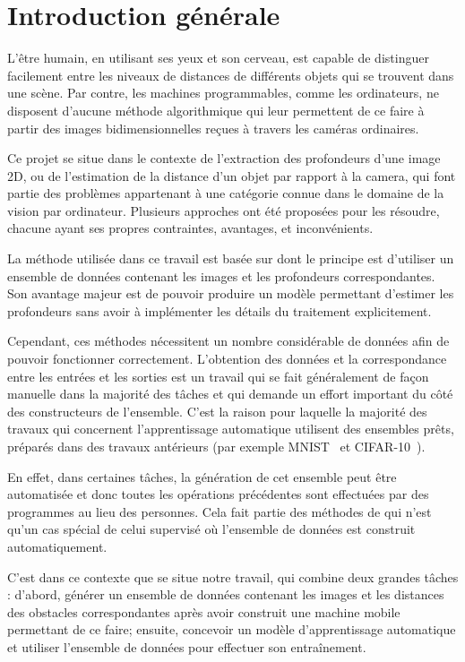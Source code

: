 \chapter*{Introduction générale}

L'être humain, en utilisant ses yeux et son cerveau, est capable de distinguer facilement
entre les niveaux de distances de différents objets qui se trouvent dans une scène.
Par contre, les machines programmables, comme les ordinateurs, ne disposent d'aucune
méthode algorithmique qui leur permettent de ce faire à partir des images bidimensionnelles
reçues à travers les caméras ordinaires.

Ce projet se situe dans le contexte de l'extraction des profondeurs d'une image 2D,
ou de l'estimation de la distance d'un objet par rapport à la camera, qui font partie des problèmes appartenant à une catégorie
connue dans le domaine de la vision par ordinateur. Plusieurs approches ont été
proposées pour les résoudre, chacune ayant ses propres contraintes, avantages, et
inconvénients.

La méthode utilisée dans ce travail est basée sur  dont le principe est d'utiliser un ensemble de données contenant les
images et les profondeurs correspondantes. Son avantage majeur est de pouvoir
produire un modèle permettant d'estimer les profondeurs sans avoir à implémenter
les détails du traitement explicitement.

Cependant, ces méthodes nécessitent
un nombre considérable de données afin de pouvoir fonctionner correctement.
L'obtention des données et la correspondance entre les entrées et les sorties
est un travail qui se fait généralement de façon manuelle dans la majorité des tâches
et qui demande un effort important du côté des constructeurs de l'ensemble. C'est la
raison pour laquelle la majorité des travaux qui concernent l'apprentissage automatique
utilisent des ensembles prêts, préparés dans des travaux antérieurs (par exemple
MNIST~\cite{lecun2010mnist} et CIFAR-10~\cite{krizhevsky2009learning}).

En effet, dans certaines tâches, la génération de cet ensemble peut être automatisée
et donc toutes les opérations précédentes sont effectuées par des programmes au lieu
des personnes. Cela fait partie des méthodes de  qui n'est qu'un cas spécial de celui supervisé où
l'ensemble de données est construit automatiquement.

C'est dans ce contexte que se situe notre travail, qui combine deux
grandes tâches : d'abord, générer un ensemble de données contenant les images et les distances
des obstacles correspondantes après avoir construit une machine mobile permettant
de ce faire; ensuite, concevoir un modèle d'apprentissage automatique et utiliser
l'ensemble de données pour effectuer son entraînement.

